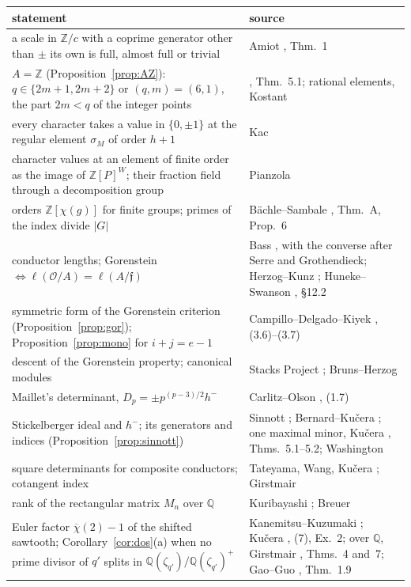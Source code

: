 \documentclass[11pt,a4paper]{article}
\theoremstyle{definition}
\newcommand{\ZZ}{\mathbb{Z}}
\newcommand{\QQ}{\mathbb{Q}}
\newcommand{\cO}{\mathcal{O}}
\newcommand{\cf}{\mathfrak{f}}
\begin{document}
\begin{center}\small
{}
\begin{tabular}{p{}p{}}
\toprule
statement & source \\
\midrule
a scale in $\ZZ/c$ with a coprime generator other than $\pm$ its own is full, almost full or trivial & Amiot \cite{Ami09}, Thm.~1 \\
$A=\ZZ$ (Proposition~\ref{prop:AZ}): $q\in\{2m+1,2m+2\}$ or $(q,m)=(6,1)$, the part $2m<q$ of the integer points & \cite{Mar26}, Thm.~5.1; rational elements, Kostant \cite[Thm.~3.1]{Kostant76} \\
every character takes a value in $\{0,\pm1\}$ at the regular element $\sigma_M$ of order $h+1$ & Kac \cite[\S\S0--1]{Kac81} \\
character values at an element of finite order as the image of $\ZZ[P]^W$; their fraction field through a decomposition group & Pianzola \cite[Thm.~1 and Prop.~10]{Pia87} \\
orders $\ZZ[\chi(g)]$ for finite groups; primes of the index divide $|G|$ & Bächle--Sambale \cite{BS20}, Thm.~A, Prop.~6 \\
conductor lengths; Gorenstein $\iff\ell(\cO/A)=\ell(A/\cf)$ & Bass \cite[Cor.~(6.5)]{Bas63}, with the converse after Serre and Grothendieck; Herzog--Kunz \cite{HK71}; Huneke--Swanson \cite{HS06}, §12.2 \\
symmetric form of the Gorenstein criterion (Proposition~\ref{prop:gor}); Proposition~\ref{prop:mono} for $i+j=e-1$ & Campillo--Delgado--Kiyek \cite{CDK94}, (3.6)--(3.7) \\
descent of the Gorenstein property; canonical modules & Stacks Project \cite[Tag~0BJL]{Stacks}; Bruns--Herzog \cite[Thm.~3.3.6, Prop.~3.3.18]{BH98} \\
Maillet's determinant, $D_p=\pm p^{(p-3)/2}h^-$ & Carlitz--Olson \cite{CO55}, (1.7) \\
Stickelberger ideal and $h^-$; its generators and indices (Proposition~\ref{prop:sinnott}) & Sinnott \cite{Sin78,Sin80}; Bernard--Kučera \cite{BK24}; one maximal minor, Kučera \cite{Kuc92}, Thms.~5.1--5.2; Washington \cite{Was97} \\
square determinants for composite conductors; cotangent index & Tateyama, Wang, Kučera \cite{Kuc01}; Girstmair \cite{Gir89} \\
rank of the rectangular matrix $M_n$ over $\QQ$ & Kuribayashi \cite{Kur08}; Breuer \cite{Bre00} \\
Euler factor $\overline\chi(2)-1$ of the shifted sawtooth; Corollary~\ref{cor:dos}(a) when no prime divisor of $q'$ splits in $\QQ(\zeta_{q'})/\QQ(\zeta_{q'})^+$ & Kanemitsu--Kuzumaki \cite{KK01}; Kučera \cite{Kuc01}, (7), Ex.~2; over $\QQ$, Girstmair \cite{Gir87}, Thms.~4 and~7; Gao--Guo \cite{GG25}, Thm.~1.9 \\

\end{tabular}
\end{center}
\end{document}
